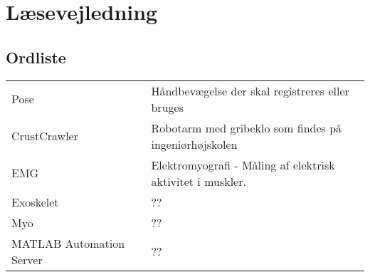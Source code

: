 \section{Læsevejledning}
\subsection*{Ordliste}
\begin{tabular}{p{80pt}lp{240pt}}
	Pose && Håndbevægelse der skal registreres eller bruges\\
	CrustCrawler && Robotarm med gribeklo som findes på ingeniørhøjskolen\\
	EMG && Elektromyografi - Måling af elektrisk aktivitet i muskler.\\
	Exoskelet && ??\\
	Myo && ??\\
	MATLAB Automation Server && ??\\
\end{tabular}